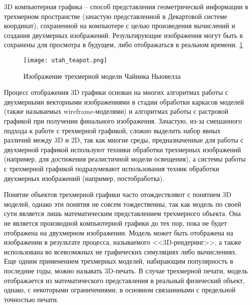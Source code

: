 3D компьютерная графика -- способ представления геометрической информации в трехмерном пространстве (зачастую представленной
в Декартовой системе координат), сохраненной на компьютере с целью произведения вычислений и создания двухмерных изображений.
Результирующие изображения могут быть в сохранены для просмотра в будущем, либо отображаться в реальном времени. \ref{figure:domain:utah}

\begin{figure}[ht]
\centering
  \texttt{[image: utah\_teapot.png]}
  \caption{Изображение трехмерной модели Чайника Ньювелла}
  \label{figure:domain:utah}
\end{figure}


Процесс отображения 3D графики основан на многих алгоритмах работы с двухмерными векторными изображениями в стадии обработки
каркасов моделей (также называемых wireframe-моделями) и алгоритмах работы с растровой графикой при получении финального изображения.
Зачастую, из-за смешанного подхода к работе с трехмерной графикой, сложно выделить набор явных различий между 3D и 2D, так как многие
среды, предназначенные для работы с двухмерной графикой используют техники обработки трехмерных изображений (например, для достижения
реалистичной модели освещения), а системы работы с трехмерной графикой подразумевают использования техник обработки двухмерных изображений
(например, постобработка).

Понятие объектов трехмерной графики часто отождествляют с понятием 3D моделей, однако эти понятия не совсем тождественны,
так как модель по своей сути является лишь математическим представлением трехмерного объекта. Она не является производной
компьютерной графики до тех пор, пока не будет отображена на двухмерном изображении. Модель может быть отображена на изображении
в результате процесса, называемого <<3D-рендеринг>>, а также использована во всевозмжных не графических симуляциях либо вычислениях.
Еще одним применением трехмерных моделей, набирающим популярность в последние годы, можно называть 3D-печать. В случае трехмерной
печати, модель отображается из математического представления в реальный физический объект, однако, с некоторыми ограничениями, в
основном связаннными с предельной точностью печати.
